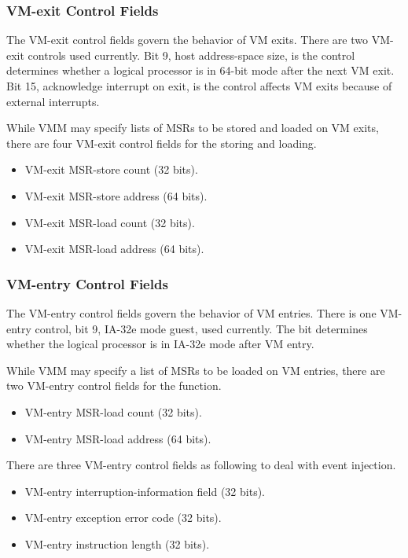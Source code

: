 \documentclass[10pt,draftclsnofoot,journal,compsoc,onecolumn]{IEEEtran}
\begin{document}
\subsubsection{VM-exit Control Fields}
	\par The VM-exit control fields govern the behavior of VM exits. There are two VM-exit controls used currently. Bit 9, host address-space size, is the control determines whether a logical processor is in 64-bit mode after the next VM exit. Bit 15, acknowledge interrupt on exit, is the control affects VM exits because of external interrupts.  
    \par While VMM may specify lists of MSRs to be stored and loaded on VM exits, there are four VM-exit control fields for the storing and loading. 
\begin{itemize}
  \item VM-exit MSR-store count (32 bits).
  \item VM-exit MSR-store address (64 bits).
  \item VM-exit MSR-load count (32 bits). 
  \item VM-exit MSR-load address (64 bits).
\end{itemize}

\subsubsection{VM-entry Control Fields}
	\par The VM-entry control fields govern the behavior of VM entries. There is one VM-entry control, bit 9, IA-32e mode guest, used currently. The bit determines whether the logical processor is in IA-32e mode after VM entry.
    \par While VMM may specify a list of MSRs to be loaded on VM entries, there are two VM-entry control fields for the function.
\begin{itemize}
  \item VM-entry MSR-load count (32 bits).
  \item VM-entry MSR-load address (64 bits).
\end{itemize}
    \par There are three VM-entry control fields as following to deal with event injection. 
\begin{itemize}
  \item VM-entry interruption-information field (32 bits).
  \item VM-entry exception error code (32 bits). 
  \item VM-entry instruction length (32 bits).
\end{itemize}
    
\end{document}

